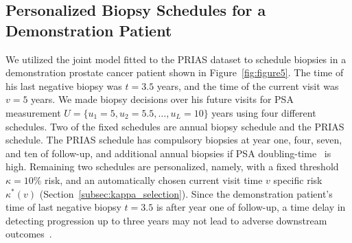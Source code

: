 \documentclass[AMA,STIX1COL]{WileyNJD-v2}
\begin{document}
\subsection{Personalized Biopsy Schedules for a Demonstration Patient}
\label{subsec:demo_patient}
We utilized the joint model fitted to the PRIAS dataset to schedule biopsies in a demonstration prostate cancer patient shown in Figure~\ref{fig:figure5}. The time of his last negative biopsy was $t=3.5$ years, and the time of the current visit was $v=5$ years. We made biopsy decisions over his future visits for PSA measurement $U=\{u_1=5, u_2=5.5,\ldots,u_L=10\}$ years using four different schedules. Two of the fixed schedules are annual biopsy schedule and the PRIAS schedule. The PRIAS schedule has compulsory biopsies at year one, four, seven, and ten of follow-up, and additional annual biopsies if PSA doubling-time~\citep{bokhorst2015compliance} is high. Remaining two schedules are personalized, namely, with a fixed threshold $\kappa=10\%$ risk, and an automatically chosen current visit time $v$ specific risk $\kappa^*(v)$ (Section~\ref{subsec:kappa_selection}). Since the demonstration patient's time of last negative biopsy $t=3.5$ is after year one of follow-up, a time delay in detecting progression
up to three years may not lead to adverse downstream outcomes~\citep{carvalho}.
\end{document}
